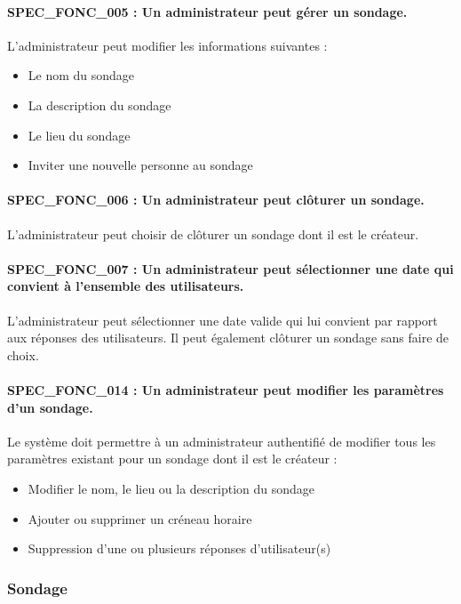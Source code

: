 \documentclass[titlepage]{report}
\begin{document}
\paragraph{SPEC\_FONC\_005 : Un administrateur peut gérer un sondage.}
L’administrateur peut modifier les informations suivantes :
\begin{itemize}
\item Le nom du sondage
\item La description du sondage
\item Le lieu du sondage
\item Inviter une nouvelle personne au sondage \end{itemize}

\paragraph{SPEC\_FONC\_006 : Un administrateur peut clôturer un sondage. }
L’administrateur peut choisir de clôturer un sondage dont il est le créateur.

\paragraph{SPEC\_FONC\_007 : Un administrateur peut sélectionner une date qui convient à l’ensemble des utilisateurs.}
L’administrateur peut sélectionner une date valide qui lui convient par rapport aux réponses des utilisateurs. Il peut également clôturer un sondage sans faire de choix.

\paragraph{SPEC\_FONC\_014 : Un administrateur peut modifier les paramètres d’un sondage.}
Le système doit permettre à un administrateur authentifié de modifier tous les paramètres existant pour un sondage dont il est le créateur : \begin{itemize}
\item Modifier le nom, le lieu ou la description du sondage
\item Ajouter ou supprimer un créneau horaire
\item Suppression d’une ou plusieurs réponses d’utilisateur(s) \end{itemize}

\subsubsection{Sondage}
\end{document}
